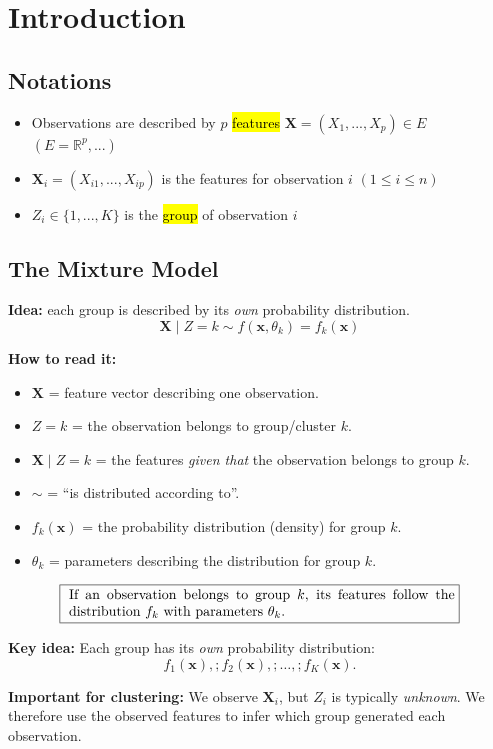 \section{Introduction}

\subsection{Notations}
\begin{itemize}
	\item Observations are described by $p$ \hl{features} $\bm{X}=(X_{1},...,X_{p})\in\mathit{E}$ $ (E=\mathbb{R}^{p},...)$
	\item $\bm{X}_{i}=(X_{i1},...,X_{ip})$ is the features for observation $i$ $(1 \leq i \leq n)$
	\item $\mathit{Z}_i\in\{1,...,\mathit{K}\}$ is the \hl{group} of observation $i$
\end{itemize}

\subsection{The Mixture Model}
\textbf{Idea:} each group is described by its \textit{own} probability distribution.
\[
\bm{X} \mid \mathit{Z} = k \sim f(\mathbf{x},\theta_{k})=f_k(\mathbf{x})
\]

\textbf{How to read it:}
\begin{itemize}
\item $\bm{X}$ = feature vector describing one observation.
\item $Z=k$ = the observation belongs to group/cluster $k$.
\item $\bm{X}\mid Z=k$ = the features \emph{given that} the observation belongs to group $k$.
\item $\sim$ = ``is distributed according to''.
\item $f_k(\mathbf{x})$ = the probability distribution (density) for group $k$.
\item $\theta_k$ = parameters describing the distribution for group $k$.
\end{itemize}

\[
\fbox{
\parbox{0.8\textwidth}{
If an observation belongs to group \(k\), its features follow
the distribution \(f_k\) with parameters \(\theta_k\).
}}
\]

\textbf{Key idea:} Each group has its \emph{own} probability distribution:
\[
f_1(\mathbf{x}),;f_2(\mathbf{x}),;\ldots,;f_K(\mathbf{x}).
\]

\textbf{Important for clustering:} We observe $\bm{X}_i$, but $Z_i$ is typically
\emph{unknown}. We therefore use the observed features to infer which group
generated each observation.

